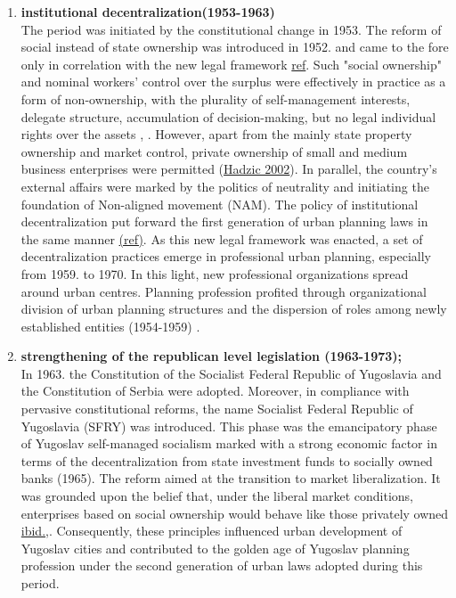 \documentclass[11pt]{report}
\begin{document}
\begin{enumerate}
\item  \textbf{institutional decentralization(1953-1963)}
\\
The period was initiated by the constitutional change in 1953.
The reform of social instead of state ownership was introduced in 1952. and came to the fore only in correlation with the new legal framework \href{ref}{ref}.
Such "social ownership" and nominal workers' control over the surplus were effectively in practice as a form of non-ownership, with the plurality of self-management interests, delegate structure, accumulation of decision-making, but no legal individual rights over the assets \href{ref}{\citealt{estrin_yugoslavia:_1991}}, \href{ref}{\citealt{zec_economic_2012}}.
However, apart from the mainly state property ownership and market control, private ownership of small and medium business enterprises were permitted (\href{ref}{Hadzic 2002}).
In parallel, the country's external affairs were marked by the politics of neutrality and initiating the foundation of Non-aligned movement (NAM).
The policy of institutional decentralization put forward the first generation of urban planning laws in the same manner \href{ref}{(ref)}.
As this new legal framework was enacted, a set of decentralization practices emerge in professional urban planning, especially from 1959. to 1970.
In this light, new professional organizations spread around urban centres.
Planning profession profited through organizational division of urban planning structures and the dispersion of roles among newly established entities (1954-1959) \href{ref}{\citealt{nedovic-budic_mornings_2011}}. 

\item  \textbf{strengthening of the republican level legislation (1963-1973);}
\\
In 1963. the Constitution of the Socialist Federal Republic of Yugoslavia  and the Constitution of Serbia were adopted.
Moreover, in compliance with pervasive constitutional reforms, the name Socialist Federal Republic of Yugoslavia (SFRY) was introduced.
This phase was the emancipatory phase of Yugoslav self-managed socialism marked with a strong economic factor in terms of the decentralization from state investment  funds  to  socially  owned  banks (1965).
The reform aimed at the transition to market liberalization.
It was grounded upon the belief that, under the liberal market conditions, enterprises based on social ownership would behave like those privately owned \href{ref}{ibid.},\href{ref}{\citealt{zec_economic_2012}}.
Consequently, these principles influenced urban development of Yugoslav cities and contributed to the golden age of Yugoslav planning profession under the second generation of urban laws adopted during this period.
\\


\end{enumerate}
\end{document}

